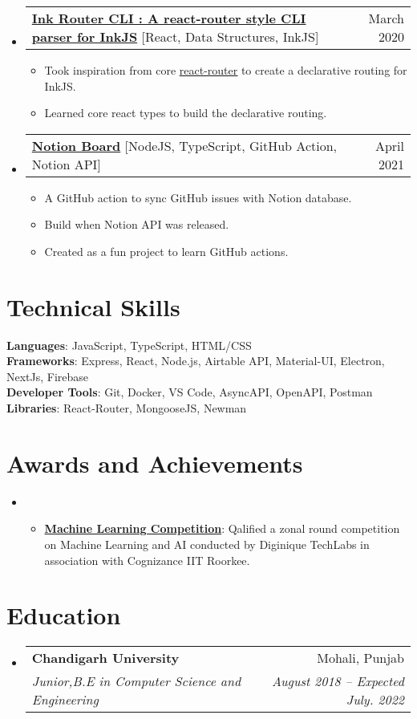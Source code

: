 \documentclass[letterpaper,11pt]{article}
\makeatletter
\newcommand{\resumeItem}[1]{
  \item\small{
    {#1 \vspace{-2pt}}
  }
}
\newcommand{\resumeSubheading}[4]{
  \vspace{-2pt}\item
    \begin{tabular*}{0.97\textwidth}[t]{l@{\extracolsep{\fill}}r}
      \textbf{#1} & #2 \\
      \textit{\small#3} & \textit{\small #4} \\
    \end{tabular*}\vspace{-7pt}
}
\newcommand{\resumeProjectHeading}[2]{
    \item
    \begin{tabular*}{0.97\textwidth}{l@{\extracolsep{\fill}}r}
      \small#1 & #2 \\
    \end{tabular*}\vspace{-7pt}
}
\newcommand{\resumeSubHeadingListStart}{\begin{itemize}[leftmargin=0.15in, label={}]}
\newcommand{\resumeSubHeadingListEnd}{\end{itemize}}
\newcommand{\resumeItemListStart}{\begin{itemize}}
\newcommand{\resumeItemListEnd}{\end{itemize}\vspace{-5pt}}
\makeatother
\begin{document}
     \resumeSubHeadingListStart
      \resumeProjectHeading
          {\textbf{\href{https://github.com/Souvikns/ink-router-cli}{Ink Router CLI : A react-router style CLI parser for InkJS}} {[React, Data Structures, InkJS]}}{March 2020}
          \resumeItemListStart
            \resumeItem{Took inspiration from core \href{https://github.com/remix-run/react-router}{\underline{react-router}} to create a declarative routing for InkJS. }
            \resumeItem{Learned core react types to build the declarative routing. }
          \resumeItemListEnd
    \resumeSubHeadingListEnd
  \resumeSubHeadingListStart
      \resumeProjectHeading
          {\textbf{\href{https://github.com/Souvikns/notion-board}{\textbf{Notion Board}}}{ [NodeJS, TypeScript, GitHub Action, Notion API]}}{April 2021}
          \resumeItemListStart
            \resumeItem{A GitHub action to sync GitHub issues with Notion database. }
            \resumeItem{Build when Notion API was released. }
            \resumeItem{Created as a fun project to learn GitHub actions.}
          \resumeItemListEnd
    \resumeSubHeadingListEnd


%
\section{Technical Skills}
 \begin{itemize}[leftmargin=0.15in, label={}]
    \small{\item{
     \textbf{Languages}{: JavaScript, TypeScript, HTML/CSS} \\
     \textbf{Frameworks}{: Express, React, Node.js, Airtable API, Material-UI, Electron, NextJs, Firebase  } \\
     \textbf{Developer Tools}{: Git, Docker, VS Code, AsyncAPI, OpenAPI, Postman} \\
     \textbf{Libraries}{: React-Router, MongooseJS, Newman }
    }}
 \end{itemize}


\section{Awards and Achievements}
 \begin{itemize}[leftmargin=0.15in, label={}]
    \small\item{\resumeItemListStart
           \resumeItem{\textbf{\href{https://drive.google.com/file/d/1NjTX2drZ3M4xpm8oKZ7bV4YLU-jEU3fY/view?usp=sharing}{Machine Learning Competition}}: Qalified a zonal round competition on Machine Learning and AI conducted by Diginique TechLabs in association with Cognizance IIT Roorkee. }
      \resumeItemListEnd
    }
 \end{itemize}
 
\section{Education}
  \resumeSubHeadingListStart
    \resumeSubheading
      {Chandigarh University}{Mohali, Punjab}
      {Junior,B.E in Computer Science and Engineering}{August 2018 -- Expected July. 2022}
  \resumeSubHeadingListEnd
\end{document}
